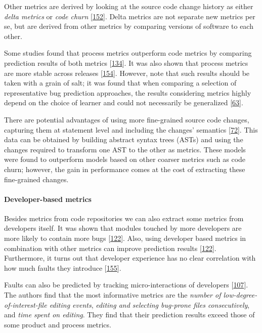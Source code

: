 \documentclass[]{book}
\let\oldparagraph\paragraph
\renewcommand{\paragraph}[1]{\oldparagraph{#1}\mbox{}}
\begin{document}
Other metrics are derived by looking at the source code change history
as either \emph{delta metrics} or \emph{code churn}
{[}\protect\hyperlink{ref-Radjenovic2013}{152}{]}. Delta metrics are not
separate new metrics per se, but are derived from other metrics by
comparing versions of software to each other.

Some studies found that process metrics outperform code metrics by
comparing prediction results of both metrics
{[}\protect\hyperlink{ref-Moser2008}{134}{]}. It was also shown that
process metrics are more stable across releases
{[}\protect\hyperlink{ref-Rahman2013}{154}{]}. However, note that such
results should be taken with a grain of salt; it was found that when
comparing a selection of representative bug prediction approaches, the
results considering metrics highly depend on the choice of learner and
could not necessarily be generalized
{[}\protect\hyperlink{ref-DAmbros2012}{63}{]}.

There are potential advantages of using more fine-grained source code
changes, capturing them at statement level and including the changes'
semantics {[}\protect\hyperlink{ref-Giger2011}{72}{]}. This data can be
obtained by building abstract syntax trees (ASTs) and using the changes
required to transform one AST to the other as metrics. These models were
found to outperform models based on other coarser metrics such as code
churn; however, the gain in performance comes at the cost of extracting
these fine-grained changes.

\paragraph{Developer-based metrics}\label{developer-based-metrics}

Besides metrics from code repositories we can also extract some metrics
from developers itself. It was shown that modules touched by more
developers are more likely to contain more bugs
{[}\protect\hyperlink{ref-Matsumoto2010}{122}{]}. Also, using developer
based metrics in combination with other metrics can improve prediction
results {[}\protect\hyperlink{ref-Matsumoto2010}{122}{]}. Furthermore,
it turns out that developer experience has no clear correlation with how
much faults they introduce
{[}\protect\hyperlink{ref-rahman2011}{155}{]}.

Faults can also be predicted by tracking micro-interactions of
developers {[}\protect\hyperlink{ref-Lee2011}{107}{]}. The authors find
that the most informative metrics are the \emph{number of
low-degree-of-interest-file editing events}, \emph{editing and selecting
bug-prone files consecutively}, and \emph{time spent on editing}. They
find that their prediction results exceed those of some product and
process metrics.
\end{document}
